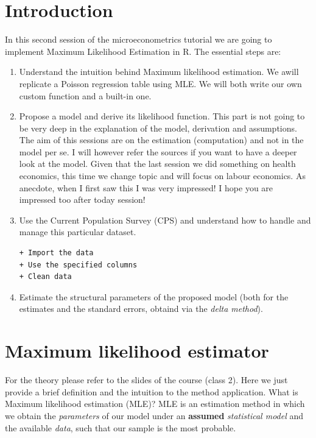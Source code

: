 \documentclass[]{book}
\begin{document}
\section{Introduction}\label{introduction-1}

In this second session of the microeconometrics tutorial we are going to
implement Maximum Likelihood Estimation in R. The essential steps are:

\begin{enumerate}
\def\labelenumi{\arabic{enumi}.}
\item
  Understand the intuition behind Maximum likelihood estimation. We
  awill replicate a Poisson regression table using MLE. We will both
  write our own custom function and a built-in one.
\item
  Propose a model and derive its likelihood function. This part is not
  going to be very deep in the explanation of the model, derivation and
  assumptions. The aim of this sessions are on the estimation
  (computation) and not in the model per se. I will however refer the
  sources if you want to have a deeper look at the model. Given that the
  last session we did something on health economics, this time we change
  topic and will focus on labour economics. As anecdote, when I first
  saw this I was very impressed! I hope you are impressed too after
  today session!
\item
  Use the Current Population Survey (CPS) and understand how to handle
  and manage this particular dataset.

\begin{verbatim}
+ Import the data
+ Use the specified columns
+ Clean data
\end{verbatim}
\item
  Estimate the structural parameters of the proposed model (both for the
  estimates and the standard errors, obtaind via the \emph{delta
  method}).
\end{enumerate}

\section{Maximum likelihood
estimator}\label{maximum-likelihood-estimator}

For the theory please refer to the slides of the course (class 2). Here
we just provide a brief definition and the intuition to the method
application. What is Maximum likelihood estimation (MLE)? MLE is an
estimation method in which we obtain the \emph{parameters} of our model
under an \textbf{assumed} \emph{statistical model} and the available
\emph{data}, such that our sample is the most probable.
\end{document}
